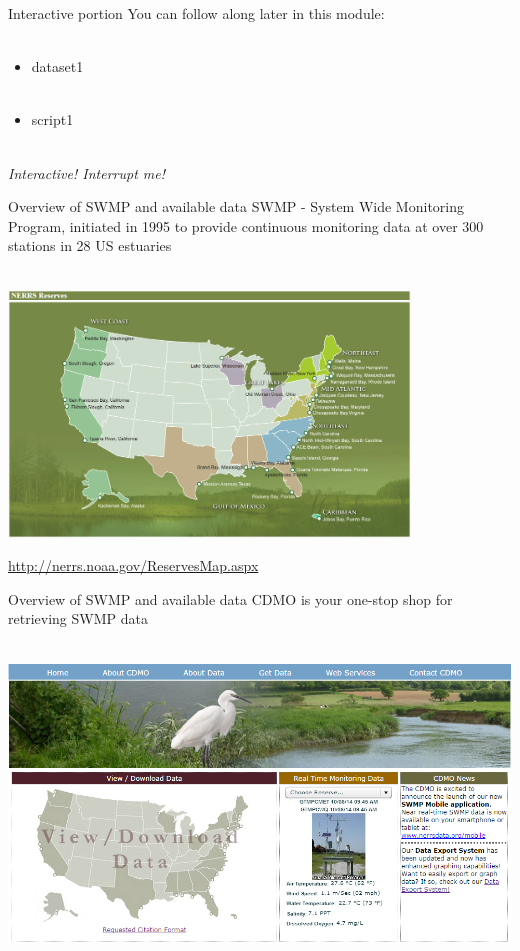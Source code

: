 \documentclass[xcolor=svgnames]{beamer}\usepackage[]{graphicx}\usepackage[]{color}
\begin{document}
\begin{frame}{Interactive portion}
You can follow along later in this module: \\~\\
\begin{itemize}
\item dataset1\\~\\
\item script1 \\~\\
\end{itemize}
\Large
\centerline{\emph{Interactive! Interrupt me!}}
\end{frame}

\begin{frame}{Overview of SWMP and available data}
SWMP - System Wide Monitoring Program, initiated in 1995 to provide continuous monitoring data at over 300 stations in 28 US estuaries \\~\\
\centerline{\includegraphics[width = 0.8\textwidth]{NERRS_locations.png}}
\tiny
\flushright
\href{http://nerrs.noaa.gov/ReservesMap.aspx}{http://nerrs.noaa.gov/ReservesMap.aspx}
\end{frame}

\begin{frame}[t]{Overview of SWMP and available data}
CDMO is your one-stop shop for retrieving SWMP data \\~\\
\centerline{\includegraphics[width = \textwidth]{cdmo_front.png}}
\end{frame}
\end{document}
